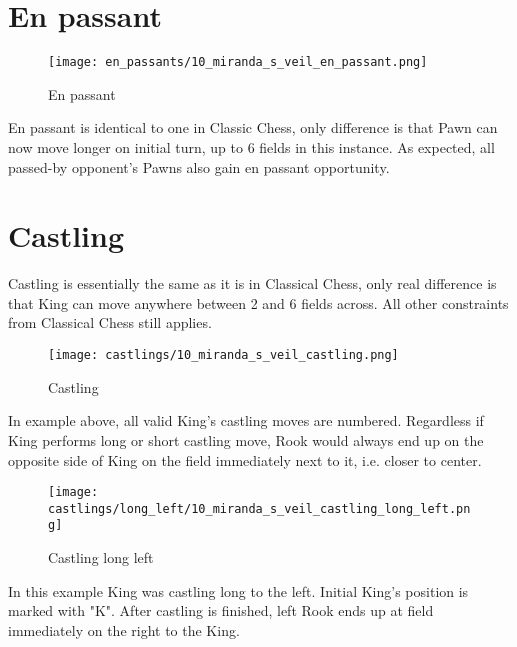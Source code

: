\section*{En passant}

\noindent
\begin{wrapfigure}{l}{0.4\textwidth}
\texttt{[image: en\_passants/10\_miranda\_s\_veil\_en\_passant.png]}
\caption{En passant}
\label{fig:10_miranda_s_veil_en_passant}
\end{wrapfigure}
En passant is identical to one in Classic Chess, only difference is that Pawn can now
move longer on initial turn, up to 6 fields in this instance. As expected, all passed-by
opponent's Pawns also gain en passant opportunity.

\clearpage %

\section*{Castling}

Castling is essentially the same as it is in Classical Chess, only real difference is that
King can move anywhere between 2 and 6 fields across. All other constraints from Classical Chess
still applies.

\noindent
\begin{figure}[!h]
\texttt{[image: castlings/10\_miranda\_s\_veil\_castling.png]}
\caption{Castling}
\label{fig:10_miranda_s_veil_castling}
\end{figure}

In example above, all valid King's castling moves are numbered. Regardless if King performs
long or short castling move, Rook would always end up on the opposite side of King on the
field immediately next to it, i.e. closer to center.

\noindent
\begin{figure}[!h]
\texttt{[image: castlings/long\_left/10\_miranda\_s\_veil\_castling\_long\_left.png]}
\caption{Castling long left}
\label{fig:10_miranda_s_veil_castling_long_left}
\end{figure}

In this example King was castling long to the left. Initial King's position is marked with "K".
After castling is finished, left Rook ends up at field immediately on the right to the King.

